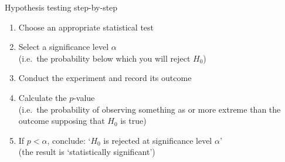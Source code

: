 \begin{frame}{Hypothesis testing step-by-step}
    \begin{enumerate}
        \item Choose an appropriate statistical test \\[\medskipamount]
        \item Select a \alert{significance level $\alpha$} \\
              (i.e.\ the probability below which you will reject $H_{0}$) \\[\medskipamount]
        \item Conduct the experiment and record its outcome \\[\medskipamount]
        \item Calculate the \alert{$p$-value} \\
              (i.e.\ the probability of observing something as or more extreme
              than the outcome supposing that $H_{0}$ is true) \\[\medskipamount]
        \item If \alert{$p < \alpha$}, conclude: `$H_{0}$ is rejected at
              significance level $\alpha$' \\
              (the result is `\alert{statistically significant}')
    \end{enumerate}
\end{frame}

\newsavebox{\TP}

\newsavebox{\TN}

\newsavebox{\FP}

